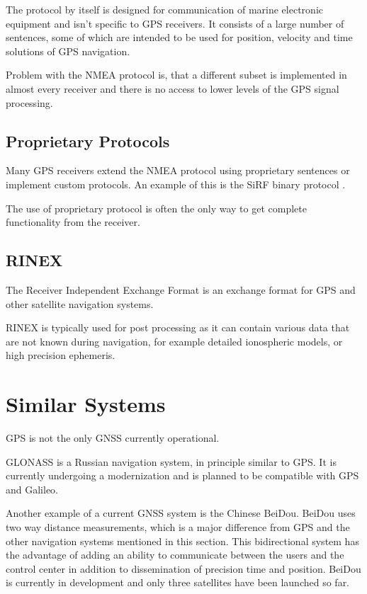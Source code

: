 The protocol by itself is designed for communication of marine electronic
equipment and isn't specific to GPS receivers.
It consists of a large number of sentences, some of which are intended to be used
for position, velocity and time solutions of GPS navigation.

Problem with the NMEA protocol is, that a different subset is implemented in almost every
receiver and there is no access to lower levels of the GPS signal processing.

\subsection{Proprietary Protocols}
Many GPS receivers extend the NMEA protocol using proprietary sentences or
implement custom protocols.
An example of this is the SiRF binary protocol \cite{sirf-protocol}.

The use of proprietary protocol is often the only way to get complete functionality from
the receiver.

\subsection{RINEX}

The Receiver Independent Exchange Format \cite{rinex-format} is an exchange format
for GPS and other satellite navigation systems.

RINEX is typically used for post processing as it can contain various data that are not
known during navigation, for example detailed ionospheric models, or high precision ephemeris.

\section{Similar Systems}

GPS is not the only GNSS currently operational.

GLONASS \cite{glonass} is a Russian navigation system, in principle similar to GPS.
It is currently undergoing a modernization and is planned to be compatible with GPS and Galileo.

Another example of a current GNSS system is the Chinese BeiDou.
BeiDou uses two way distance measurements, which is a major difference from GPS and the other navigation
systems mentioned in this section.
This bidirectional system has the advantage of adding an ability to communicate between the
users and the control center in addition to dissemination of precision time and position.
BeiDou is currently in development and only three satellites have been launched so far.


